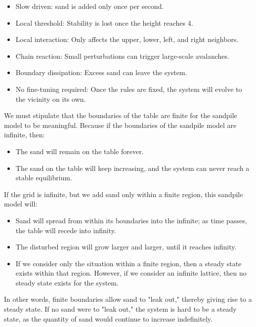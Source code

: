 \documentclass{article}
\begin{document}
\begin{itemize}
    \item Slow driven: sand is added only once per second.
    \item Local threshold: Stability is lost once the height reaches 4.
    \item Local interaction: Only affects the upper, lower, left, and right neighbors.
    \item Chain reaction: Small perturbations can trigger large-scale avalanches.
    \item Boundary dissipation: Excess sand can leave the system.
    \item No fine-tuning required: Once the rules are fixed, the system will evolve to the vicinity on its own.
\end{itemize}

We must stipulate that the boundaries of the table are finite for the sandpile model to be meaningful. Because if the boundaries of the sandpile model are infinite, then:

\begin{itemize}
    \item The sand will remain on the table forever.
    \item The sand on the table will keep increasing, and the system can never reach a stable equilibrium.
\end{itemize}

If the grid is infinite, but we add sand only within a finite region, this sandpile model will:

\begin{itemize}
    \item Sand will spread from within its boundaries into the infinite; as time passes, the table will recede into infinity.
    \item The disturbed region will grow larger and larger, until it reaches infinity.
    \item If we consider only the situation within a finite region, then a steady state exists within that region. However, if we consider an infinite lattice, then no steady state exists for the system.
\end{itemize}

In other words, finite boundaries allow sand to "leak out," thereby giving rise to a steady state. If no sand were to "leak out," the system is hard to be a steady state, as the quantity of sand would continue to increase indefinitely.

\clearpage
\end{document}
